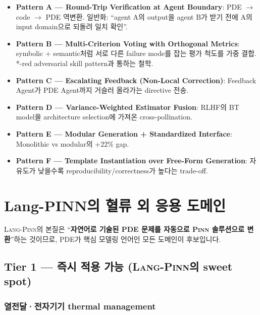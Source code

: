 \documentclass[11pt,a4paper,oneside]{report}
\newcommand{\pinn}{\textsc{Pinn}}
\newcommand{\langpinn}{\textsc{Lang-Pinn}}
\begin{document}
\begin{itemize}
\item \textbf{Pattern A --- Round-Trip Verification at Agent Boundary}: PDE $\rightarrow$ code $\rightarrow$ PDE 역변환. 일반화: ``agent A의 output을 agent B가 받기 전에 A의 input domain으로 되돌려 일치 확인''.

\item \textbf{Pattern B --- Multi-Criterion Voting with Orthogonal Metrics}: symbolic + semantic처럼 서로 다른 failure mode를 잡는 평가 척도를 가중 결합. *-red adversarial skill pattern과 통하는 철학.

\item \textbf{Pattern C --- Escalating Feedback (Non-Local Correction)}: Feedback Agent가 PDE Agent까지 거슬러 올라가는 directive 전송.

\item \textbf{Pattern D --- Variance-Weighted Estimator Fusion}: RLHF의 BT model을 architecture selection에 가져온 cross-pollination.

\item \textbf{Pattern E --- Modular Generation + Standardized Interface}: Monolithic vs modular의 +22\% gap.

\item \textbf{Pattern F --- Template Instantiation over Free-Form Generation}: 자유도가 낮을수록 reproducibility/correctness가 높다는 trade-off.
\end{itemize}

\chapter{Lang-PINN의 혈류 외 응용 도메인}

\langpinn{}의 본질은 ``\textbf{자연어로 기술된 PDE 문제를 자동으로 \pinn{} 솔루션으로 변환}''하는 것이므로, PDE가 핵심 모델링 언어인 모든 도메인이 후보입니다.

\section{Tier 1 --- 즉시 적용 가능 (\langpinn{}의 sweet spot)}

\subsection{열전달·전자기기 thermal management}
\end{document}
